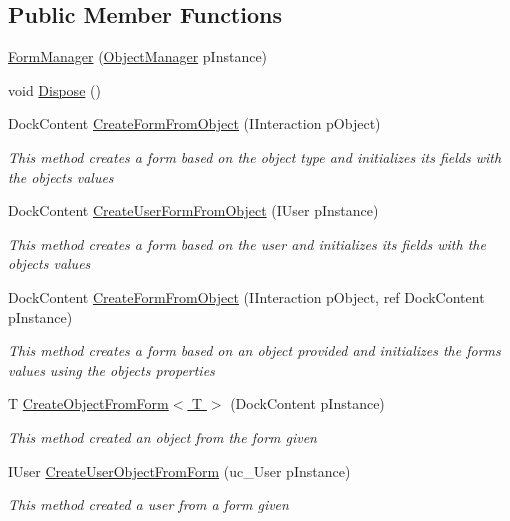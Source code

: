 \subsection*{Public Member Functions}
\begin{DoxyCompactItemize}
\item 
\hyperlink{class_plex_byte_1_1_mo_cap_1_1_managers_1_1_form_manager_a223d01d1620cb745cccc6670b2eac182}{Form\+Manager} (\hyperlink{class_plex_byte_1_1_mo_cap_1_1_managers_1_1_object_manager}{Object\+Manager} p\+Instance)
\item 
void \hyperlink{class_plex_byte_1_1_mo_cap_1_1_managers_1_1_form_manager_a3e134b15ffed4ab501ac57e042f9f9b2}{Dispose} ()
\item 
Dock\+Content \hyperlink{class_plex_byte_1_1_mo_cap_1_1_managers_1_1_form_manager_a2b0542e25bc380890500c436922f125f}{Create\+Form\+From\+Object} (I\+Interaction p\+Object)
\begin{DoxyCompactList}\small\item\em This method creates a form based on the object type and initializes its fields with the objects values \end{DoxyCompactList}\item 
Dock\+Content \hyperlink{class_plex_byte_1_1_mo_cap_1_1_managers_1_1_form_manager_ae24225bb504b38ff1f871f7efad0cb4d}{Create\+User\+Form\+From\+Object} (I\+User p\+Instance)
\begin{DoxyCompactList}\small\item\em This method creates a form based on the user and initializes its fields with the objects values \end{DoxyCompactList}\item 
Dock\+Content \hyperlink{class_plex_byte_1_1_mo_cap_1_1_managers_1_1_form_manager_af7cef004388b3e578ce7c1d8172aa51d}{Create\+Form\+From\+Object} (I\+Interaction p\+Object, ref Dock\+Content p\+Instance)
\begin{DoxyCompactList}\small\item\em This method creates a form based on an object provided and initializes the forms values using the objects properties \end{DoxyCompactList}\item 
T \hyperlink{class_plex_byte_1_1_mo_cap_1_1_managers_1_1_form_manager_a2f1cf05e0f540ec1207e3452873f7fd0}{Create\+Object\+From\+Form$<$ T $>$} (Dock\+Content p\+Instance)
\begin{DoxyCompactList}\small\item\em This method created an object from the form given \end{DoxyCompactList}\item 
I\+User \hyperlink{class_plex_byte_1_1_mo_cap_1_1_managers_1_1_form_manager_a08f5c4aca4c6a73bc8618fcb7370ee76}{Create\+User\+Object\+From\+Form} (uc\+\_\+\+User p\+Instance)
\begin{DoxyCompactList}\small\item\em This method created a user from a form given \end{DoxyCompactList}\end{DoxyCompactItemize}


